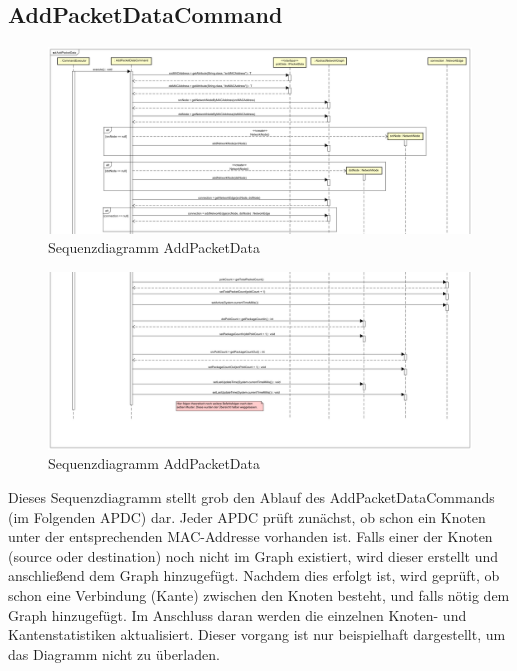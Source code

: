 \subsection{AddPacketDataCommand}
\begin{figure}
  \centering
  \includegraphics[width=\paperwidth]{../diagramimages/sd_AddPacketData1.png}
  \caption[Sequenzdiagramm AddPacketData]{Sequenzdiagramm AddPacketData}
\end{figure}
\FloatBarrier

\begin{figure}
  \centering
  \includegraphics[width=\paperwidth]{../diagramimages/sd_AddPacketData2.png}
  \caption[Sequenzdiagramm AddPacketData]{Sequenzdiagramm AddPacketData}
\end{figure}
\FloatBarrier

Dieses Sequenzdiagramm stellt grob den Ablauf des AddPacketDataCommands (im Folgenden APDC) dar. Jeder APDC prüft zunächst,
ob schon ein Knoten unter der entsprechenden MAC-Addresse vorhanden ist. Falls einer der Knoten (source oder destination)
noch nicht im Graph existiert, wird dieser erstellt und anschließend dem Graph hinzugefügt. Nachdem dies erfolgt ist, wird
geprüft, ob schon eine Verbindung (Kante) zwischen den Knoten besteht, und falls nötig dem Graph hinzugefügt.
Im Anschluss daran werden die einzelnen Knoten- und Kantenstatistiken aktualisiert. Dieser vorgang ist nur beispielhaft
dargestellt, um das Diagramm nicht zu überladen.
